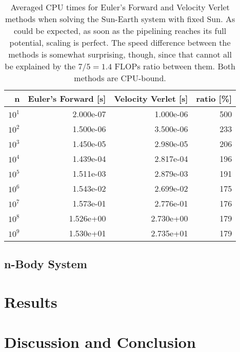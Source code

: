 \documentclass[]{article}
\begin{document}
\begin{table}[!ht]
	\caption{Averaged CPU times for Euler's Forward and Velocity Verlet methods when solving the Sun-Earth system with fixed Sun. As could be expected, as soon as the pipelining reaches its full potential, scaling is perfect. The speed difference between the methods is somewhat surprising, though, since that cannot all be explained by the $7/5=1.4$ FLOPs ratio between them. Both methods are CPU-bound.}
	\label{tab:cpu-time}
	\begin{center}
		\begin{tabular}{rrrr}
			\toprule
			n &     Euler's Forward [s] &    Velocity Verlet [s] & ratio [\%] \\
			\midrule
			$10^1$ & 2.000e-07 & 1.000e-06 & 500 \\
			$10^2$ & 1.500e-06 & 3.500e-06 & 233 \\
			$10^3$ & 1.450e-05 & 2.980e-05 & 206 \\
			$10^4$ & 1.439e-04 & 2.817e-04 & 196 \\
			$10^5$ & 1.511e-03 & 2.879e-03 & 191 \\
			$10^6$ & 1.543e-02 & 2.699e-02 & 175 \\
			$10^7$ & 1.573e-01 & 2.776e-01 & 176 \\
			$10^8$ & 1.526e+00 & 2.730e+00 & 179 \\
			$10^9$ & 1.530e+01 & 2.735e+01 & 179 \\
			\bottomrule
		\end{tabular}
	\end{center}
\end{table}






\subsection{n-Body System} \label{n-body}

\section{Results} \label{results}




\section{Discussion and Conclusion} \label{conclusion}

\clearpage


\end{document}
